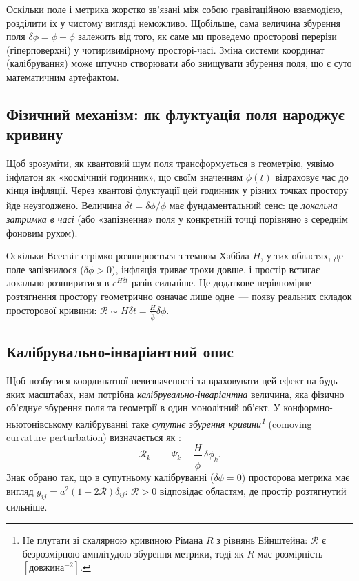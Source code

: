 Оскільки поле і метрика жорстко зв'язані між собою гравітаційною взаємодією, розділити
їх у чистому вигляді неможливо. Щобільше, сама величина збурення поля $\delta\phi = \phi - \bar\phi$
залежить від того, як саме ми проведемо просторові перерізи (гіперповерхні) у чотиривимірному
просторі-часі. Зміна системи координат (калібрування) може штучно створювати або знищувати
збурення поля, що є суто математичним артефактом.

\subsection*{Фізичний механізм: як флуктуація поля народжує кривину}

Щоб зрозуміти, як квантовий шум поля трансформується в геометрію, уявімо інфлатон як «космічний годинник»,
що своїм значенням $\phi(t)$ відраховує час до кінця інфляції. Через квантові флуктуації
цей годинник у різних точках простору йде неузгоджено. Величина $\delta t = \delta\phi / \dot{\bar\phi}$
має фундаментальний сенс: це \emph{локальна затримка в часі} (або «запізнення» поля у конкретній точці
порівняно з середнім фоновим рухом).

Оскільки Всесвіт стрімко розширюється з темпом Хаббла $H$, у тих областях, де поле запізнилося ($\delta\phi > 0$),
інфляція триває трохи довше, і простір встигає локально розширитися в $e^{H \delta t}$ разів сильніше.
Це додаткове нерівномірне розтягнення простору геометрично означає лише одне~--- появу реальних
складок просторової кривини: $\mathcal{R} \sim H \delta t = \frac{H}{\dot{\bar\phi}}\delta\phi$.

\subsection*{Калібрувально-інваріантний опис}

Щоб позбутися координатної невизначеності та враховувати цей ефект на будь-яких масштабах,
нам потрібна \emph{калібрувально-інваріантна} величина, яка фізично об'єднує збурення поля та геометрії
в один монолітний об'єкт. У конформно-ньютонівському калібруванні таке \emph{супутнє збурення кривини\footnote{Не плутати зі скалярною кривиною Рімана $R$
з рівнянь Ейнштейна: $\mathcal{R}$ є безрозмірною амплітудою
збурення метрики, тоді як $R$ має розмірність
$[\text{довжина}^{-2}]$.}}
(comoving curvature perturbation) визначається як \cite{bardeen_1980}:
\begin{equation}\label{eq:R_definition}
  \mathcal{R}_k \equiv -\Psi_k + \frac{H}{\dot{\bar\phi}}\,\delta\phi_k.
\end{equation}%
Знак обрано так, що в супутньому калібруванні ($\delta\phi=0$) просторова метрика має вигляд $g_{ij} = a^2(1+2\mathcal{R})\delta_{ij}$: $\mathcal{R}>0$ відповідає областям, де простір розтягнутий сильніше.

